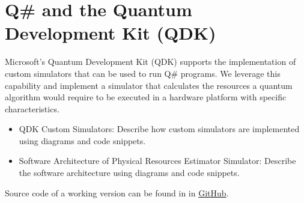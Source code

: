 
\section{Q\# and the Quantum Development Kit (QDK)}

Microsoft's Quantum Development Kit (QDK) supports the implementation of custom simulators that can be used to run Q\# programs. We leverage this capability and implement a simulator that calculates the resources a quantum algorithm would require to be executed in a hardware platform with specific characteristics.

\begin{itemize}
    \item QDK Custom Simulators: Describe how custom simulators are implemented using diagrams and code snippets.
    \item Software Architecture of Physical Resources Estimator Simulator: Describe the software architecture using diagrams and code snippets.
\end{itemize}

Source code of a working version can be found in in \href{https://github.com/cesarzc/uw-master-in-physics-project}{GitHub}.
